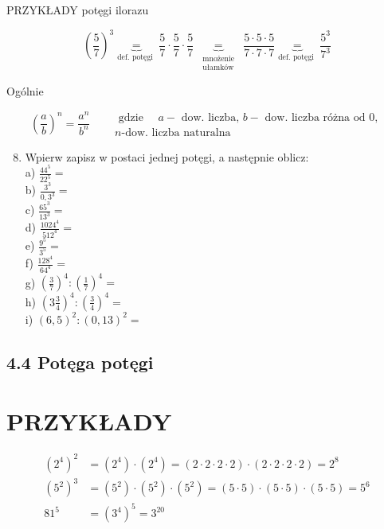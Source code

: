 \documentclass[10pt]{article}
\begin{document}
PRZYKŁADY potęgi ilorazu

\[
\left(\frac{5}{7}\right)^{3} \underbrace{=}_{\text {def. potęgi }} \frac{5}{7} \cdot \frac{5}{7} \cdot \frac{5}{7} \underbrace{=}_{\substack{\text { mnożenie } \\ \text { ułamków }}} \frac{5 \cdot 5 \cdot 5}{7 \cdot 7 \cdot 7} \underbrace{=}_{\text {def. potęgi }} \frac{5^{3}}{7^{3}}
\]

Ogólnie

\[
\left(\frac{a}{b}\right)^{n}=\frac{a^{n}}{b^{n}} \quad \begin{aligned}
& \text { gdzie } \quad a-\text { dow. liczba, } b-\text { dow. liczba różna od } 0, \\
& n \text {-dow. liczba naturalna }
\end{aligned}
\]

\begin{enumerate}
  \setcounter{enumi}{7}
  \item Wpierw zapisz w postaci jednej potęgi, a następnie oblicz:\\
a) \(\frac{44^{5}}{22^{5}}=\)\\
b) \(\frac{3^{3}}{0,3^{3}}=\)\\
c) \(\frac{65^{3}}{13^{3}}=\)\\
d) \(\frac{1024^{4}}{512^{4}}=\)\\
e) \(\frac{9^{5}}{3^{5}}=\)\\
f) \(\frac{128^{4}}{64^{4}}=\)\\
g) \(\left(\frac{3}{7}\right)^{4}:\left(\frac{1}{7}\right)^{4}=\)\\
h) \(\left(3 \frac{3}{4}\right)^{4}:\left(\frac{3}{4}\right)^{4}=\)\\
i) \((6,5)^{2}:(0,13)^{2}=\)
\end{enumerate}

\subsection*{4.4 Potęga potęgi}
\section*{PRZYKŁADY}
\[
\begin{aligned}
\left(2^{4}\right)^{2} & =\left(2^{4}\right) \cdot\left(2^{4}\right)=(2 \cdot 2 \cdot 2 \cdot 2) \cdot(2 \cdot 2 \cdot 2 \cdot 2)=2^{8} \\
\left(5^{2}\right)^{3} & =\left(5^{2}\right) \cdot\left(5^{2}\right) \cdot\left(5^{2}\right)=(5 \cdot 5) \cdot(5 \cdot 5) \cdot(5 \cdot 5)=5^{6} \\
81^{5} & =\left(3^{4}\right)^{5}=3^{20}
\end{aligned}
\]
\end{document}
